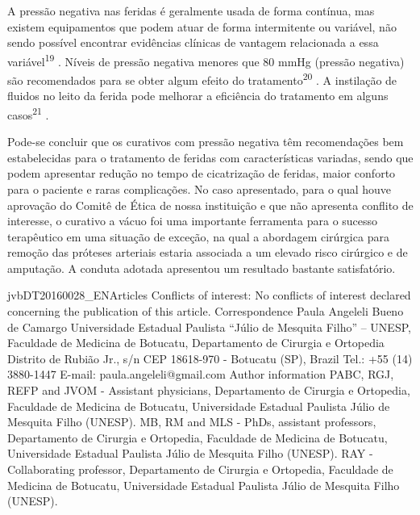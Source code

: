 \documentclass[numberinsection,times,10pt,spreadimages]{memoir}
\begin{document}
A pressão negativa nas feridas é geralmente usada de forma contínua, mas existem
equipamentos que podem atuar de forma intermitente ou variável, não sendo
possível
encontrar evidências clínicas de vantagem relacionada a essa
variável\textsuperscript{19}
. Níveis de pressão negativa
menores que 80 mmHg (pressão negativa) são recomendados para se obter algum
efeito
do tratamento\textsuperscript{20}
. A instilação de
fluidos no leito da ferida pode melhorar a eficiência do tratamento em alguns
casos\textsuperscript{21}
.

Pode-se concluir que os curativos com pressão negativa têm recomendações bem
estabelecidas para o tratamento de feridas com características variadas, sendo
que
podem apresentar redução no tempo de cicatrização de feridas, maior conforto
para o
paciente e raras complicações. No caso apresentado, para o qual houve aprovação
do
Comitê de Ética de nossa instituição e que não apresenta conflito de interesse,
o
curativo a vácuo foi uma importante ferramenta para o sucesso terapêutico em uma
situação de exceção, na qual a abordagem cirúrgica para remoção das próteses
arteriais estaria associada a um elevado risco cirúrgico e de amputação. A
conduta
adotada apresentou um resultado bastante satisfatório.

jvbDT20160028\_{}ENArticles
Conflicts of interest: No conflicts of interest declared concerning the
publication of this article.
\label{*}
Correspondence Paula Angeleli Bueno de Camargo Universidade
Estadual Paulista “Júlio de Mesquita Filho” – UNESP, Faculdade de Medicina de
Botucatu, Departamento de Cirurgia e Ortopedia Distrito de Rubião Jr., s/n CEP
18618-970 - Botucatu (SP), Brazil Tel.: +55 (14) 3880-1447 E-mail:
paula.angeleli@gmail.com
Author information PABC, RGJ, REFP and JVOM - Assistant physicians,
Departamento de Cirurgia e Ortopedia, Faculdade de Medicina de Botucatu,
Universidade Estadual Paulista Júlio de Mesquita Filho (UNESP). MB, RM and
MLS - PhDs, assistant professors, Departamento de Cirurgia e Ortopedia,
Faculdade de Medicina de Botucatu, Universidade Estadual Paulista Júlio de
Mesquita Filho (UNESP). RAY - Collaborating professor, Departamento de
Cirurgia e Ortopedia, Faculdade de Medicina de Botucatu, Universidade
Estadual Paulista Júlio de Mesquita Filho (UNESP).
\end{document}
